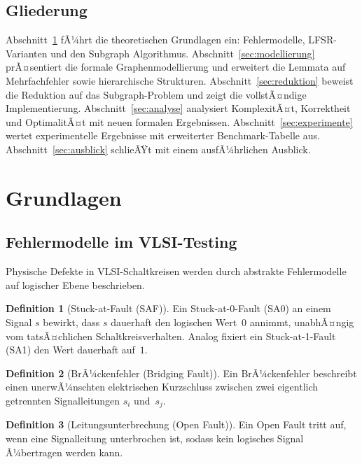 ﻿\documentclass[a4paper,12pt]{article}
\theoremstyle{definition}
\newtheorem{definition}{Definition}
\begin{document}
\subsection{Gliederung}

Abschnitt~\ref{sec:grundlagen} fÃ¼hrt die theoretischen Grundlagen ein:
Fehlermodelle, LFSR-Varianten und den Subgraph Algorithmus.
Abschnitt~\ref{sec:modellierung} prÃ¤sentiert die formale Graphenmodellierung
und erweitert die Lemmata auf Mehrfachfehler sowie hierarchische Strukturen.
Abschnitt~\ref{sec:reduktion} beweist die Reduktion auf das Subgraph-Problem
und zeigt die vollstÃ¤ndige Implementierung.
Abschnitt~\ref{sec:analyse} analysiert KomplexitÃ¤t, Korrektheit und
OptimalitÃ¤t mit neuen formalen Ergebnissen.
Abschnitt~\ref{sec:experimente} wertet experimentelle Ergebnisse mit
erweiterter Benchmark-Tabelle aus.
Abschnitt~\ref{sec:ausblick} schlieÃŸt mit einem ausfÃ¼hrlichen Ausblick.

\section{Grundlagen}
\label{sec:grundlagen}

\subsection{Fehlermodelle im VLSI-Testing}

Physische Defekte in VLSI-Schaltkreisen werden durch abstrakte Fehlermodelle
auf logischer Ebene beschrieben.

\begin{definition}[Stuck-at-Fault (SAF)]
  Ein Stuck-at-0-Fault (SA0) an einem Signal $s$ bewirkt, dass $s$ dauerhaft
  den logischen Wert~$0$ annimmt, unabhÃ¤ngig vom tatsÃ¤chlichen
  Schaltkreis\-verhalten. Analog fixiert ein Stuck-at-1-Fault (SA1) den Wert
  dauerhaft auf~$1$.
\end{definition}

\begin{definition}[BrÃ¼ckenfehler (Bridging Fault)]
  Ein BrÃ¼ckenfehler beschreibt einen unerwÃ¼nschten elektrischen Kurzschluss
  zwischen zwei eigentlich getrennten Signalleitungen $s_i$ und~$s_j$.
\end{definition}

\begin{definition}[Leitungsunterbrechung (Open Fault)]
  Ein Open Fault tritt auf, wenn eine Signalleitung unterbrochen ist, sodass
  kein logisches Signal Ã¼bertragen werden kann.
\end{definition}
\end{document}
